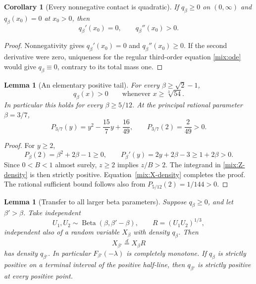\documentclass[11pt,a4paper]{article}
\numberwithin{equation}{section}
\newtheorem{lemma}[theorem]{Lemma}
\newtheorem{corollary}[theorem]{Corollary}
\theoremstyle{definition}\newtheorem{definition}[theorem]{Definition}
\theoremstyle{remark}\newtheorem{remark}[theorem]{Remark}
\begin{document}
\begin{corollary}[Every nonnegative contact is quadratic]
\label{mix:quadratic-contact}
If \(q_\beta\ge0\) on \((0,\infty)\) and
\(q_\beta(x_0)=0\) at \(x_0>0\), then
\[
                q_\beta'(x_0)=0,
                \qquad q_\beta''(x_0)>0.
\]
\end{corollary}

\begin{proof}
Nonnegativity gives \(q_\beta'(x_0)=0\) and
\(q_\beta''(x_0)\ge0\).  If the second derivative were zero,
uniqueness for the regular third-order equation \eqref{mix:ode}
would give \(q_\beta\equiv0\), contrary to its total mass one.
\end{proof}

\begin{lemma}[An elementary positive tail]
\label{mix:positive-tail}
For every \(\beta\ge\sqrt2-1\),
\[
                   q_\beta(x)>0
          \qquad\text{whenever }x\ge\sqrt[3]{54}.
\]
In particular this holds for every \(\beta\ge5/12\).  At the
principal rational parameter \(\beta=3/7\),
\[
 P_{3/7}(y)=y^2-\frac{15}{7}y+\frac{16}{49},
 \qquad P_{3/7}(2)=\frac2{49}>0.
\]
\end{lemma}

\begin{proof}
For \(y\ge2\),
\[
 P_\beta(2)=\beta^2+2\beta-1\ge0,
 \qquad P_\beta'(y)=2y+2\beta-3\ge1+2\beta>0.
\]
Since \(0<B<1\) almost surely, \(z\ge2\) implies \(z/B>2\).
The integrand in \eqref{mix:Z-density} is then strictly positive.
Equation~\eqref{mix:X-density} completes the proof.  The rational
sufficient bound follows also from
\(P_{5/12}(2)=1/144>0\).
\end{proof}

\begin{lemma}[Transfer to all larger beta parameters]
\label{mix:beta-transfer}
Suppose \(q_\beta\ge0\), and let \(\beta'>\beta\).  Take independent
\[
 U_1,U_2\sim\operatorname{Beta}(\beta,\beta'-\beta),
 \qquad R=(U_1U_2)^{1/3},
\]
independent also of a random variable \(X_\beta\) with density
\(q_\beta\).  Then
\begin{equation}\label{mix:transfer-law}
                    X_{\beta'}\overset d=X_\beta R
\end{equation}
has density \(q_{\beta'}\).  In particular \(F_{\beta'}(-\lambda)\)
is completely monotone.  If \(q_\beta\) is strictly positive on a
terminal interval of the positive half-line, then \(q_{\beta'}\)
is strictly positive at every positive point.
\end{lemma}
\end{document}
